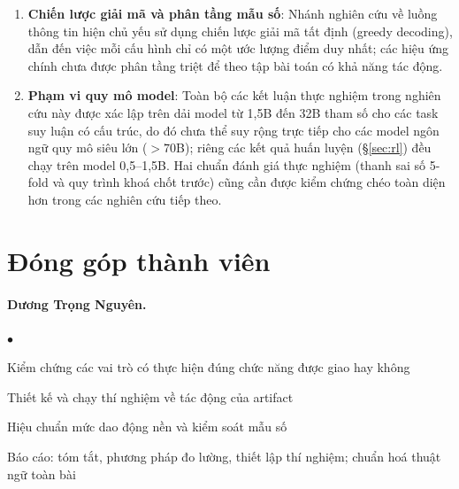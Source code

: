 \documentclass[11pt,a4paper]{article}
\begin{document}
\begin{enumerate}
      đủ độ nhạy thống kê để xác lập chắc chắn trên tập MBPP; ngưỡng đổi dấu $g^\ast$ chưa được gắn
      khoảng tin cậy tham số.
\item \textbf{Chiến lược giải mã và phân tầng mẫu số}: Nhánh nghiên cứu về luồng thông tin hiện chủ
      yếu sử dụng chiến lược giải mã tất định (greedy decoding), dẫn đến việc mỗi cấu hình chỉ có một
      ước lượng điểm duy nhất; các hiệu ứng chính chưa được phân tầng triệt để theo tập bài toán có
      khả năng tác động.
\item \textbf{Phạm vi quy mô model}: Toàn bộ các kết luận thực nghiệm trong nghiên cứu này được xác
      lập trên dải model từ 1,5B đến 32B tham số cho các task suy luận có cấu trúc, do đó chưa thể
      suy rộng trực tiếp cho các model ngôn ngữ quy mô siêu lớn ($>70$B); riêng các kết quả huấn
      luyện (\S\ref{sec:rl}) đều chạy trên model 0,5--1,5B. Hai chuẩn đánh giá thực
      nghiệm (thanh sai số 5-fold và quy trình khoá chốt trước) cũng cần được kiểm chứng chéo toàn
      diện hơn trong các nghiên cứu tiếp theo.
\end{enumerate}


\clearpage
\section*{Đóng góp thành viên}

\newenvironment{ddgop}%
  {\begin{list}{$\bullet$}{%
     \setlength{\leftmargin}{1.4em}\setlength{\labelwidth}{0.8em}%
     \setlength{\itemsep}{1pt}\setlength{\parsep}{0pt}\setlength{\topsep}{3pt}}}%
  {\end{list}}

\paragraph{Dương Trọng Nguyên.}
\begin{ddgop}
\item Kiểm chứng các vai trò có thực hiện đúng chức năng được giao hay không
\item Thiết kế và chạy thí nghiệm về tác động của artifact
\item Hiệu chuẩn mức dao động nền và kiểm soát mẫu số
\item Báo cáo: tóm tắt, phương pháp đo lường, thiết lập thí nghiệm; chuẩn hoá thuật ngữ toàn bài
\end{ddgop}
\end{document}
